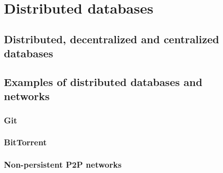 \section{Distributed databases}

\subsection{Distributed, decentralized and centralized databases}

\subsection{Examples of distributed databases and networks}

\subsubsection{Git}
\subsubsection{BitTorrent}
\subsubsection{Non-persistent P2P networks}